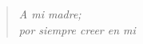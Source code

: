\begin{verse}
\begin{flushright}
\vspace*{3cm}
\textit{A mi madre;\\
        por siempre creer en mi}
\end{flushright}
\end{verse}
